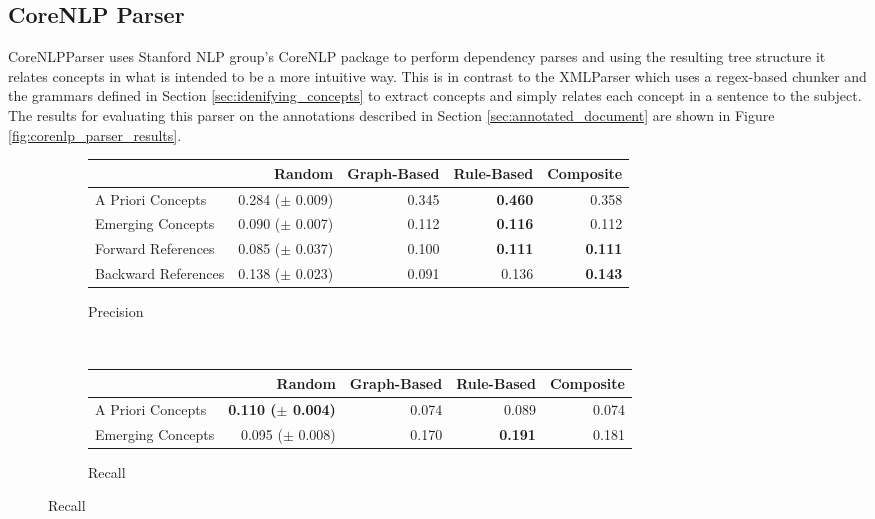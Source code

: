 \documentclass[12pt]{article}
\theoremstyle{grammarstyle}
\begin{document}
\subsection{CoreNLP Parser} \label{sec:corenlp_parser}
CoreNLPParser uses Stanford NLP group's CoreNLP package to perform dependency parses and using the resulting tree structure it relates concepts in what is intended to be a more intuitive way. This is in contrast to the XMLParser which uses a regex-based chunker and the grammars defined in Section \ref{sec:idenifying_concepts} to extract concepts and simply relates each concept in a sentence to the subject. The results for evaluating this parser on the annotations described in Section \ref{sec:annotated_document} are shown in Figure \ref{fig:corenlp_parser_results}.

\begin{figure}[h]
    \centering
    \begin{subfigure}[b]{\textwidth}
        \caption{Precision}
        \label{fig:corenlp_precision}
        \centering
        \begin{tabular}{|l|r|r|r|r|}
            \hline
            {} & Random & Graph-Based & Rule-Based & Composite \\
            \hline
            A Priori Concepts & 0.284 ($\pm$ 0.009) & 0.345 &       \textbf{0.460} & 0.358 \\
            Emerging Concepts & 0.090 ($\pm$ 0.007) & 0.112 &       \textbf{0.116} & 0.112 \\
            \hline
            Forward References & 0.085 ($\pm$ 0.037) & 0.100 &       \textbf{0.111} &      \textbf{0.111} \\
            Backward References & 0.138 ($\pm$ 0.023) & 0.091 & 0.136 &      \textbf{0.143} \\
            \hline
        \end{tabular}
    \end{subfigure} \\
    \begin{subfigure}[b]{\textwidth}
        \caption{Recall}
        \label{fig:corenlp_recall}
        \centering
        \begin{tabular}{|l|r|r|r|r|}
            \hline
            {} & Random & Graph-Based & Rule-Based & Composite \\
            \hline
            A Priori Concepts &  \textbf{0.110 ($\pm$ 0.004)} & 0.074 & 0.089 & 0.074 \\
            Emerging Concepts & 0.095 ($\pm$ 0.008) & 0.170 &      \textbf{ 0.191} & 0.181 \\

\end{tabular}
\end{subfigure}
\end{figure}
\end{document}
